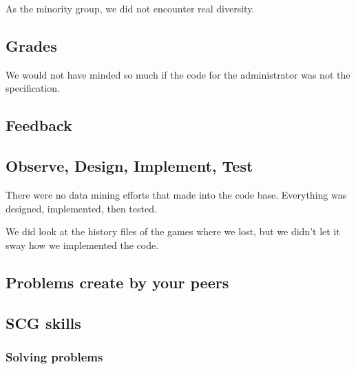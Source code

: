 \documentclass[letterpaper,12pt,oneside]{article}
\begin{document}
As the minority group, we did not encounter real diversity.

\subsection{Grades}

We would not have minded so much if the code for the administrator was not
the specification.

\subsection{Feedback}

\subsection{Observe, Design, Implement, Test}
There were no data mining efforts that made into the code base. Everything
was designed, implemented, then tested.

We did look at the history files of the games where we lost, but we didn't
let it sway how we implemented the code.

\subsection{Problems create by your peers}

\subsection{SCG skills}

\subsubsection{Solving problems}
\end{document}
